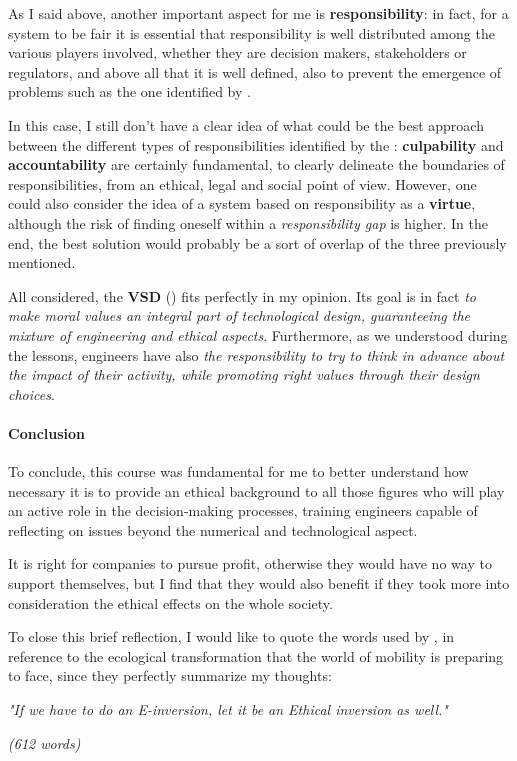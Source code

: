 As I said above, another important aspect for me is \textbf{responsibility}: in fact, for a system to be fair it is essential that responsibility is well distributed among the various players involved, whether they are decision makers, stakeholders or regulators, and above all that it is well defined, also to prevent the emergence of problems such as the one identified by \cite{VANDEPOEL2018MoralHands.}. 

In this case, I still don't have a clear idea of what could be the best approach between the different types of responsibilities identified by the \cite{EuropeanCommission2020EthicsEU}: \textbf{culpability} and \textbf{accountability} are certainly fundamental, to clearly delineate the boundaries of responsibilities, from an ethical, legal and social point of view. However, one could also consider the idea of a system based on responsibility as a \textbf{virtue}, although the risk of finding oneself within a \textit{responsibility gap} is higher. In the end, the best solution would probably be a sort of overlap of the three previously mentioned.

All considered, the \textbf{VSD} (\cite{Watkins2021UsingSystem}) fits perfectly in my opinion. Its goal is in fact \textit{to make moral values an integral part of technological design, guaranteeing the mixture of engineering and ethical aspects}. Furthermore, as we understood during the lessons, engineers have also \textit{the responsibility to try to think in advance about the impact of their activity, while promoting right values through their design choices}.
\newpage
\paragraph{Conclusion}
To conclude, this course was fundamental for me to better understand how necessary it is to provide an ethical background to all those figures who will play an active role in the decision-making processes, training engineers capable of reflecting on issues beyond the numerical and technological aspect. 

It is right for companies to pursue profit, otherwise they would have no way to support themselves, but I find that they would also benefit if they took more into consideration the ethical effects on the whole society.

To close this brief reflection, I would like to quote the words used by \cite{eticatrasporti}, in reference to the ecological transformation that the world of mobility is preparing to face, since they perfectly summarize my thoughts:
\begin{displayquote}
\textit{"If we have to do an E-inversion, let it be an Ethical inversion as well."}
\end{displayquote}

\emph{(612 words)}